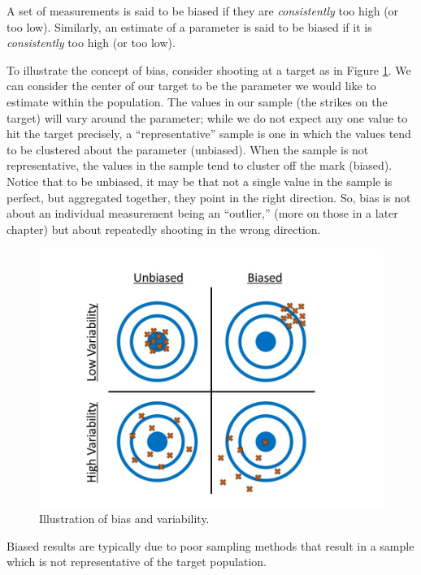 \documentclass[]{book}
\theoremstyle{plain}
\theoremstyle{mydefn}
\theoremstyle{myexmpl}
\theoremstyle{remark}
\let\BeginKnitrBlock\begin \let\EndKnitrBlock\end
\let\BeginKnitrBlock\begin \let\EndKnitrBlock\end
\begin{document}
\BeginKnitrBlock{definition}[Bias]
\protect\hypertarget{def:defn-bias}{}{\label{def:defn-bias} {} }A set of measurements is said to be biased if they are
\emph{consistently} too high (or too low). Similarly, an estimate of a
parameter is said to be biased if it is \emph{consistently} too high (or
too low).
\EndKnitrBlock{definition}

To illustrate the concept of bias, consider shooting at a target as in
Figure \ref{fig:data-bias}. We can consider the center of our target to
be the parameter we would like to estimate within the population. The
values in our sample (the strikes on the target) will vary around the
parameter; while we do not expect any one value to hit the target
precisely, a ``representative'' sample is one in which the values tend
to be clustered about the parameter (unbiased). When the sample is not
representative, the values in the sample tend to cluster off the mark
(biased). Notice that to be unbiased, it may be that not a single value
in the sample is perfect, but aggregated together, they point in the
right direction. So, bias is not about an individual measurement being
an ``outlier,'' (more on those in a later chapter) but about repeatedly
shooting in the wrong direction.

\begin{figure}

{\centering \includegraphics[width=0.8\linewidth]{./images/Data-Bias} 

}

\caption{Illustration of bias and variability.}\label{fig:data-bias}
\end{figure}

\BeginKnitrBlock{rmdkeyidea}
Biased results are typically due to poor sampling methods that result in
a sample which is not representative of the target population.
\EndKnitrBlock{rmdkeyidea}
\end{document}
